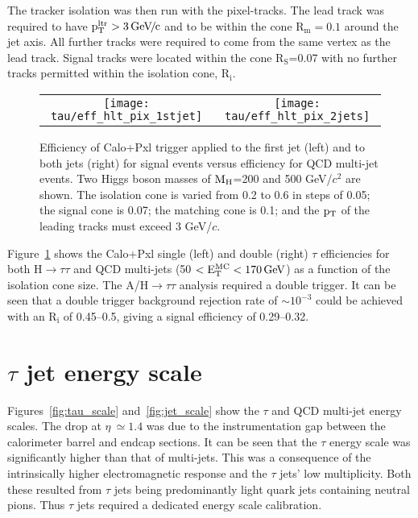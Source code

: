 The tracker isolation was then run with the pixel-tracks. The lead track was required to have $\mathrm{p_{T}^{ltr}} > 3 {\,\mathrm{Ge}\hspace{-.08em}\mathrm{V}\hspace{-0.16em}/\hspace{-0.08em}\mathrm{c}}$ and to be within the cone $\mathrm{R_{m}} = 0.1$ around the jet axis. All further tracks were required to come from the same vertex as the lead track. Signal tracks were located within the cone $\mathrm{R_{S}}$=0.07 with no further tracks permitted within the isolation cone, $\mathrm{R_{i}}$.

\begin{figure}[!hHtb]
\begin{center}
\begin{tabular}{cc}
\texttt{[image: tau/eff\_hlt\_pix\_1stjet]}
&
\texttt{[image: tau/eff\_hlt\_pix\_2jets]}
\end{tabular}
    \caption{Efficiency of Calo+Pxl trigger applied to the 
             first jet (left) and to both jets (right) for signal 
             events versus efficiency for QCD multi-jet events. 
             Two Higgs boson masses of $\mathrm{M}_{\rm H}$=200 and 
             500 GeV/$c^{2}$ are shown. The isolation cone is varied from 0.2 to 
             0.6 in steps of 0.05; the signal cone is 0.07; the matching cone is 0.1; 
             and the $\mathrm{p_{T}}$ of the leading tracks must exceed 
             3 GeV/$c$.~\cite{CMS_TDR_PHYS_vol1, citeulike:800614} 
}
\label{fig:pxl_eff}
\end{center}
\end{figure}

Figure~\ref{fig:pxl_eff} shows the Calo+Pxl single (left) and double (right) $\tau$ efficiencies for both H$\rightarrow \tau \tau$ and QCD multi-jets (50 $< \mathrm{E_{T}^{MC}} < 170 \,\mathrm{Ge\hspace{-.08em}V}$) as a function of the isolation cone size. The A/H$\rightarrow \tau \tau$ analysis required a double trigger. It can be seen that a double trigger background rejection rate of $\sim 10^{-3}$ could be achieved with an $\mathrm{R_{i}}$ of 0.45--0.5, giving a signal efficiency of 0.29--0.32.

\section{$\tau$ jet energy scale}
Figures~\ref{fig:tau_scale} and~\ref{fig:jet_scale} show the $\tau$ and QCD multi-jet energy scales. The drop at $\eta~\simeq 1.4$ was due to the instrumentation gap between the calorimeter barrel and endcap sections. It can be seen that the $\tau$ energy scale was significantly higher than that of multi-jets. This was a consequence of the intrinsically higher electromagnetic response and the $\tau$ jets' low multiplicity. Both these resulted from $\tau$ jets being predominantly light quark jets containing neutral pions. Thus $\tau$ jets required a dedicated energy scale calibration.

